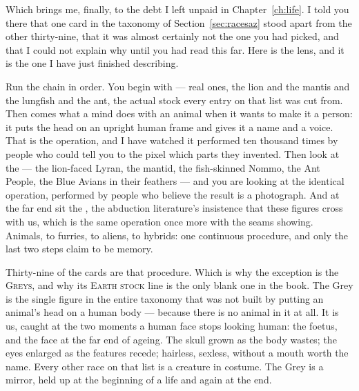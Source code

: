 \vspace{4pt}\par
\noindent Which brings me, finally, to the debt I left unpaid in Chapter~\ref{ch:life}. I told you
there that one card in the taxonomy of Section~\ref{sec:racesaz} stood apart from the other
thirty-nine, that it was almost certainly not the one you had picked, and that I could not
explain why until you had read this far. Here is the lens, and it is the one I have just
finished describing.

\vspace{4pt}\par
\noindent Run the chain in order. You begin with  --- real ones, the lion and the mantis
and the lungfish and the ant, the actual stock every entry on that list was cut from. Then
comes what a mind does with an animal when it wants to make it a person: it puts the head on
an upright human frame and gives it a name and a voice. That is the  operation, and
I have watched it performed ten thousand times by people who could tell you to the pixel
which parts they invented. Then look at the  --- the lion-faced Lyran, the mantid,
the fish-skinned Nommo, the Ant People, the Blue Avians in their feathers --- and you are
looking at the identical operation, performed by people who believe the result is a
photograph. And at the far end sit the , the abduction
literature's insistence that these figures cross with us, which is the same operation once
more with the seams showing. Animals, to furries, to aliens, to hybrids: one continuous
procedure, and only the last two steps claim to be memory.

\vspace{4pt}\par
\noindent Thirty-nine of the cards are that procedure. Which is why the exception is the
\textsc{Greys}, and why its \textsc{Earth stock} line is the only blank one in the book. The
Grey is the single figure in the entire taxonomy that was not built by putting an animal's head
on a human body --- because there is no animal in it at all. It is us, caught at the two
moments a human face stops looking human: the foetus, and the face at the far end of ageing.
The skull grown as the body wastes; the eyes enlarged as the features recede; hairless,
sexless, without a mouth worth the name. Every other race on that list is a creature in
costume. The Grey is a mirror, held up at the beginning of a life and again at the end.

